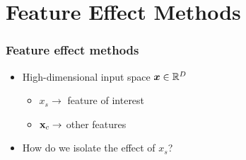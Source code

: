 \section{Feature Effect Methods}

\begin{frame}
  \frametitle{Feature effect methods}
  \begin{itemize}
  \item High-dimensional input space \(\boldsymbol{x} \in \mathbb{R}^D\)
    \begin{itemize}
    \item \(x_s \rightarrow \) feature of interest
    \item \(\mathbf{x}_c \rightarrow\) other features
    \end{itemize}
  \item How do we isolate the effect of \(x_s\)?
  \end{itemize}
\end{frame}


